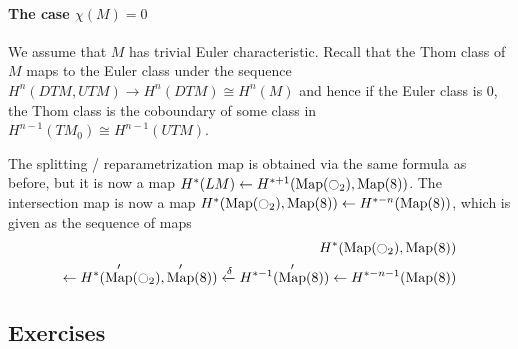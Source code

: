 \documentclass{scrartcl}
\theoremstyle{plain}
\theoremstyle{definition}
\newcommand{\iso}{\cong}
\newcommand{\from}{\leftarrow}
\DeclareMathOperator{\Map}{Map}
\begin{document}
\paragraph{The case $\chi(M) = 0$} We assume that $M$ has trivial Euler characteristic. Recall that the Thom class of $M$ maps to the Euler class under the sequence $H^n(DTM, UTM)\to H^n(DTM)\iso H^n(M)$ and hence if the Euler class is $0$, the Thom class is the coboundary of some class in $H^{n-1}(TM_0)\iso H^{n-1}(UTM)$.

The splitting / reparametrization map is obtained via the same formula as before, but it is now a map $H^*(LM) \from H^{*+1}(\Map(\ocircle_2), \Map(8))$. The intersection map is now a map $H^*(\Map(\ocircle_2), \Map(8)) \from H^{*-n}(\Map(8))$, which is given as the sequence of maps
\begin{align*}
    H^*(\Map(\ocircle_2), \Map(8)) \\ \from H^*(\Map'(\ocircle_2), \Map'(8)) \xleftarrow{\delta} H^{*-1}(\Map'(8)) \from H^{*-n-1}(\Map(8))
\end{align*}


\subsection{Exercises}
\end{document}
